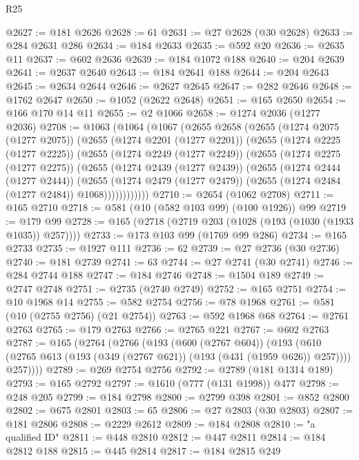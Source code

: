 \begin{lexlean}{R25}
\begin{coremodule}
@2627 := @181 @2626
@2628 := 61
@2631 := @27 @2628 (@30 @2628)
@2633 := @284 @2631 @286
@2634 := @184 @2633
@2635 := @592 @20
@2636 := @2635 @11
@2637 := @602 @2636
@2639 := @184 @1072 @188
@2640 := @204 @2639
@2641 := @2637 @2640
@2643 := @184 @2641 @188
@2644 := @204 @2643
@2645 := @2634 @2644
@2646 := @2627 @2645
@2647 := @282 @2646
@2648 := @1762 @2647
@2650 := @1052 (@2622 @2648)
@2651 := @165 @2650
@2654 := @166 @170 @14 @11
@2655 := @2 @1066
@2658 := @1274 @2036 (@1277 @2036)
@2708 := @1063
    (@1064
      (@1067
        (@2655
          @2658
          (@2655
            (@1274 @2075 (@1277 @2075))
            (@2655
              (@1274 @2201 (@1277 @2201))
              (@2655
                (@1274 @2225 (@1277 @2225))
                (@2655
                  (@1274 @2249 (@1277 @2249))
                  (@2655
                    (@1274 @2275 (@1277 @2275))
                    (@2655
                      (@1274 @2439 (@1277 @2439))
                      (@2655
                        (@1274 @2444 (@1277 @2444))
                        (@2655
                          (@1274 @2479 (@1277 @2479))
                          (@2655 (@1274 @2484 (@1277 @2484)) @1068))))))))))))
@2710 := @2654 (@1062 @2708)
@2711 := @165 @2710
@2718 := @581 (@10 (@582 @103 @99) (@100 @1926)) @99
@2719 := @179 @99
@2728 := @165 (@2718 (@2719 @203 (@1028 (@193 (@1030 (@1933 @1035)) @257))))
@2733 := @173 @103 @99 (@1769 @99 @286)
@2734 := @165 @2733
@2735 := @1927 @111
@2736 := 62
@2739 := @27 @2736 (@30 @2736)
@2740 := @181 @2739
@2741 := 63
@2744 := @27 @2741 (@30 @2741)
@2746 := @284 @2744 @188
@2747 := @184 @2746
@2748 := @1504 @189
@2749 := @2747 @2748
@2751 := @2735 (@2740 @2749)
@2752 := @165 @2751
@2754 := @10 @1968 @14
@2755 := @582 @2754
@2756 := @78 @1968
@2761 := @581 (@10 (@2755 @2756) (@21 @2754))
@2763 := @592 @1968 @68
@2764 := @2761 @2763
@2765 := @179 @2763
@2766 := @2765 @221
@2767 := @602 @2763
@2787 := @165
    (@2764
      (@2766
        (@193
          (@600 (@2767 @604))
          (@193
            (@610 (@2765 @613 (@193 (@349 (@2767 @621)) (@193 (@431 (@1959 @626)) @257))))
            @257))))
@2789 := @269 @2754 @2756
@2792 := @2789 (@181 @1314 @189)
@2793 := @165 @2792
@2797 := @1610 (@777 (@131 @1998)) @477
@2798 := @248 @205
@2799 := @184 @2798
@2800 := @2799 @398
@2801 := @852 @2800
@2802 := @675 @2801
@2803 := 65
@2806 := @27 @2803 (@30 @2803)
@2807 := @181 @2806
@2808 := @2229 @2612
@2809 := @184 @2808
@2810 := "a qualified ID"
@2811 := @448 @2810
@2812 := @447 @2811
@2814 := @184 @2812 @188
@2815 := @445 @2814
@2817 := @184 @2815 @249

\end{coremodule}
\end{lexlean}
